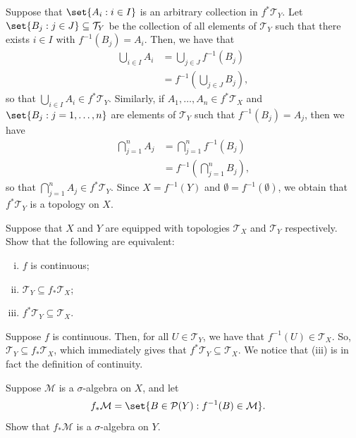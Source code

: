\documentclass[10pt]{mypackage}
\begin{document}
\begin{solution}
  Suppose that $\set{A_i : i\in I}$ is an arbitrary collection in $f^{\ast}\mathcal{T}_Y$. Let $\set{B_j : j\in J}\subseteq \mathcal{T}_Y$ be the collection of all elements of $\mathcal{T}_Y$ such that there exists $i\in I$ with $f^{-1}\left( B_j \right) = A_i$. Then, we have that
  \begin{align*}
    \bigcup_{i\in I}A_i &= \bigcup_{j\in J}f^{-1}\left( B_j \right)\\
                        &= f^{-1}\left( \bigcup_{j\in J}B_j \right),
  \end{align*}
  so that $\bigcup_{i\in I}A_i\in f^{\ast}\mathcal{T}_Y$. Similarly, if $A_1,\dots,A_n\in f^{\ast}\mathcal{T}_X$ and $\set{B_j : j=1,\dots,n}$ are elements of $\mathcal{T}_Y$ such that $f^{-1}\left( B_j \right) = A_j$, then we have
  \begin{align*}
    \bigcap_{j=1}^{n}A_j &= \bigcap_{j=1}^{n} f^{-1}\left( B_j \right)\\
                         &= f^{-1}\left( \bigcap_{j=1}^{n}B_j \right),
  \end{align*}
  so that $\bigcap_{j=1}^{n}A_j\in f^{\ast}\mathcal{T}_Y$. Since $X = f^{-1}\left( Y \right)$ and $\emptyset = f^{-1}\left( \emptyset \right)$, we obtain that $f^{\ast}\mathcal{T}_Y$ is a topology on $X$.
\end{solution}
\begin{problem}
  Suppose that $X$ and $Y$ are equipped with topologies $\mathcal{T}_X$ and $\mathcal{T}_Y$ respectively. Show that the following are equivalent:
  \begin{enumerate}[(i)]
    \item $f$ is continuous;
    \item $\mathcal{T}_Y\subseteq f_{\ast}\mathcal{T}_X$;
    \item $f^{\ast}\mathcal{T}_Y\subseteq \mathcal{T}_X$.
  \end{enumerate}
\end{problem}
\begin{solution}
  Suppose $f$ is continuous. Then, for all $U\in \mathcal{T}_Y$, we have that $f^{-1}(U)\in \mathcal{T}_X$. So, $\mathcal{T}_Y\subseteq f_{\ast}\mathcal{T}_X$, which immediately gives that $f^{\ast}\mathcal{T}_Y\subseteq \mathcal{T}_X$. We notice that (iii) is in fact the definition of continuity.
\end{solution}
\begin{problem}
  Suppose $ \mathcal{M} $ is a $\sigma$-algebra on $X$, and let 
  \begin{align*}
    f_{\ast}\mathcal{M} &= \set{B\in \mathcal{P}(Y) : f^{-1}(B)\in \mathcal{M}}.
  \end{align*}
  Show that $f_{\ast}\mathcal{M}$ is a $\sigma$-algebra on $Y$.
\end{problem}
\end{document}
